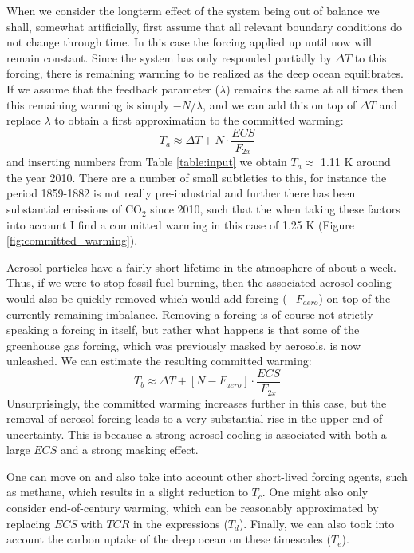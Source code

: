 \documentclass[12pt]{book}
\begin{document}
When we consider the longterm effect of the system being out of balance we shall, somewhat artificially, first assume that all relevant boundary conditions do not change through time. In this case the forcing applied up until now will remain constant. Since the system has only responded partially by $\Delta T$ to this forcing, there is remaining warming to be realized as the deep ocean equilibrates. If we assume that the feedback parameter ($\lambda$) remains the same at all times then this remaining warming is simply $-N/\lambda$, and we can add this on top of $\Delta T$ and replace $\lambda$ to obtain a first approximation to the committed warming:
\begin{equation}
T_a \approx \Delta T + N \cdot \frac{ECS}{F_{2x}}
\end{equation}
and inserting numbers from Table \ref{table:input} we obtain $T_a \approx$ 1.11 K around the year 2010. There are a number of small subtleties to this, for instance the period 1859-1882 is not really pre-industrial and further there has been substantial emissions of CO$_2$ since 2010, such that the when taking these factors into account I find a committed warming in this case of 1.25 K (Figure \ref{fig:committed_warming}). 

Aerosol particles have a fairly short lifetime in the atmosphere of about a week. Thus, if we were to stop fossil fuel burning, then the associated aerosol cooling would also be quickly removed which would add forcing ($-F_{aero}$) on top of the currently remaining imbalance. Removing a forcing is of course not strictly speaking a forcing in itself, but rather what happens is that some of the greenhouse gas forcing, which was previously masked by aerosols, is now unleashed. We can estimate the resulting committed warming:
\begin{equation}
T_b \approx \Delta T + \left[ N - F_{aero} \right] \cdot \frac{ECS}{F_{2x}}
\end{equation}
Unsurprisingly, the committed warming increases further in this case, but the removal of aerosol forcing leads to a very substantial rise in the upper end of uncertainty. This is because a strong aerosol cooling is associated with both a large $ECS$ and a strong masking effect. 

One can move on and also take into account other short-lived forcing agents, such as methane, which results in a slight reduction to $T_c$. One might also only consider end-of-century warming, which can be reasonably approximated by replacing $ECS$ with $TCR$ in the expressions ($T_d$). Finally, we  can also took into account the carbon uptake of the deep ocean on these timescales ($T_e$). 
\end{document}
